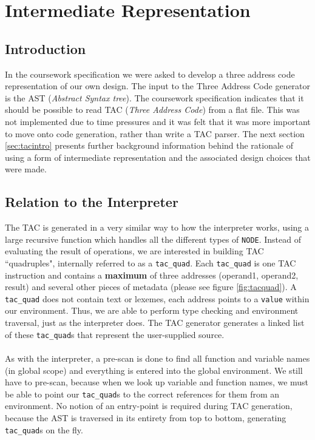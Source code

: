 \section{Intermediate Representation}

\subsection{Introduction}
In the coursework specification we were asked to develop a three address code representation of our own design. The input to the Three Address Code generator is the AST (\emph{Abstract Syntax tree}). The coursework specification indicates that it should be possible to read TAC (\emph{Three Address Code}) from a flat file. This was not implemented due to time pressures and it was felt that it was more important to move onto code generation, rather than write a TAC parser. The next section \ref{sec:tacintro} presents further background information behind the rationale of using a form of intermediate representation and the associated design choices that were made.

\subsection{Relation to the Interpreter}
The TAC is generated in a very similar way to how the interpreter works, using a large recursive function which handles all the different types of \verb!NODE!. Instead of evaluating the result of operations, we are interested in building TAC ``quadruples", internally referred to as a \verb!tac_quad!. Each \verb!tac_quad! is one TAC instruction and contains a \textbf{maximum} of three addresses (operand1, operand2, result) and several other pieces of metadata (please see figure \ref{fig:tacquad}). A \verb!tac_quad! does not contain text or lexemes, each address points to a \verb!value! within our environment. Thus, we are able to perform type checking and environment traversal, just as the interpreter does. The TAC generator generates a linked list of these \verb!tac_quad!s that represent the user-supplied \mmc source.
\ \\ \ \\
As with the interpreter, a pre-scan is done to find all function and variable names (in global scope) and everything is entered into the global environment. We still have to pre-scan, because when we look up variable and function names, we must be able to point our \verb!tac_quad!s to the correct references for them from an environment. No notion of an entry-point is required during TAC generation, because the AST is traversed in its entirety from top to bottom, generating \verb!tac_quad!s on the fly.

